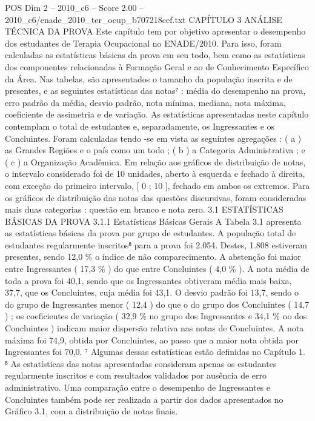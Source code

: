 \begin{textsample}{POS Dim 2 – 2010\_c6 – Score 2.00 – 2010\_c6/enade\_2010\_ter\_ocup\_b707218cef.txt}  \label{ex:f2_pos_184}
CAPÍTULO 3 ANÁLISE TÉCNICA DA PROVA Este capítulo tem por objetivo apresentar o desempenho dos estudantes de Terapia Ocupacional no ENADE/2010.
Para isso, foram calculadas as estatísticas básicas da prova em seu todo, bem como as estatísticas dos componentes relacionadas à Formação Geral e ao de Conhecimento Específico da Área.
Nas tabelas, são apresentados o tamanho da população inscrita e de presentes, e as seguintes estatísticas das notas⁷ : média do desempenho na prova, erro padrão da média, desvio padrão, nota mínima, mediana, nota máxima, coeficiente de assimetria e de variação.
As estatísticas apresentadas neste capítulo contemplam o total de estudantes e, separadamente, os Ingressantes e os Concluintes.
Foram calculadas tendo -se em vista as seguintes agregações : ( a ) as Grandes Regiões e o país como um todo ; ( b ) a Categoria Administrativa ; e ( c ) a Organização Acadêmica.
Em relação aos gráficos de distribuição de notas, o intervalo considerado foi de 10 unidades, aberto à esquerda e fechado à direita, com exceção do primeiro intervalo, [ 0 ; 10 ], fechado em ambos os extremos.
Para os gráficos de distribuição das notas das questões discursivas, foram consideradas mais duas categorias : questão em branco e nota zero. 3.1 ESTATÍSTICAS BÁSICAS DA PROVA 3.1.1 Estatísticas Básicas Gerais A Tabela 3.1 apresenta as estatísticas básicas da prova por grupo de estudantes.
A população total de estudantes regularmente inscritos⁸ para a prova foi 2.054.
Destes, 1.808 estiveram presentes, sendo 12,0 \% o índice de não comparecimento.
A abstenção foi maior entre Ingressantes ( 17,3 \% ) do que entre Concluintes ( 4,0 \% ).
A nota média de toda a prova foi 40,1, sendo que os Ingressantes obtiveram média mais baixa, 37,7, que os Concluintes, cuja média foi 43,1.
O desvio padrão foi 13,7, sendo o do grupo de Ingressantes menor ( 12,4 ) do que o do grupo dos Concluintes ( 14,7 ) ; os coeficientes de variação ( 32,9 \% no grupo dos Ingressantes e 34,1 \% no dos Concluintes ) indicam maior dispersão relativa nas notas de Concluintes.
A nota máxima foi 74,9, obtida por Concluintes, ao passo que a maior nota obtida por Ingressantes foi 70,0. ⁷ Algumas dessas estatísticas estão definidas no Capítulo 1. ⁸ As estatísticas das notas apresentadas consideram apenas os estudantes regularmente inscritos e com resultados validados por ausência de erro administrativo.
Uma comparação entre o desempenho de Ingressantes e Concluintes também pode ser realizada a partir dos dados apresentados no Gráfico 3.1, com a distribuição de notas finais.

\end{textsample}
